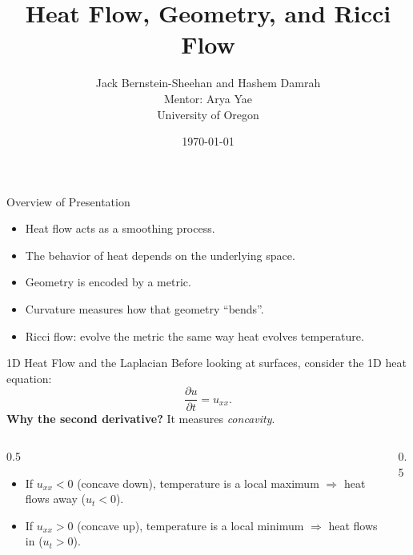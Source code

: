 \documentclass[aspectratio=1610,10pt]{beamer}
\title{Heat Flow, Geometry, and Ricci Flow}
\author{
  Jack Bernstein-Sheehan and Hashem Damrah \\
  \small{Mentor: Arya Yae} \\
  \small{University of Oregon}
}
\date{\today}
\begin{document}
  \begin{frame}
    \titlepage
  \end{frame}

  \begin{frame}{Overview of Presentation}
    \begin{itemize}
      \item Heat flow acts as a smoothing process.
      \item The behavior of heat depends on the underlying space.
      \item Geometry is encoded by a metric.
      \item Curvature measures how that geometry ``bends''.
      \item Ricci flow: evolve the metric the same way heat evolves temperature.
    \end{itemize}
  \end{frame}

  \begin{frame}{1D Heat Flow and the Laplacian}
    Before looking at surfaces, consider the 1D heat equation:
    \[%
      \frac{\partial u}{\partial t} = u_{xx}
    .\]%
    \textbf{Why the second derivative?} It measures \emph{concavity}.
    \vspace{0.5cm}

    \begin{columns}
      \begin{column}{0.5\textwidth}
        \begin{itemize}
          \item If $u_{xx} < 0$ (concave down), temperature is a local maximum $\Rightarrow$ heat flows away ($u_t < 0$).
          \item If $u_{xx} > 0$ (concave up), temperature is a local minimum $\Rightarrow$ heat flows in ($u_t > 0$).
        \end{itemize}
      \end{column}
      \begin{column}{0.5\textwidth}
        \begin{center}
        \end{center}
      \end{column}
    \end{columns}
  \end{frame}
\end{document}
